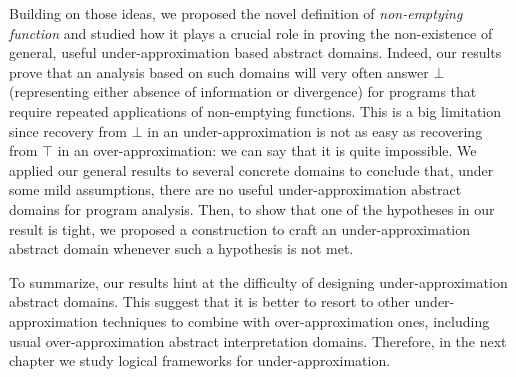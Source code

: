 Building on those ideas, we proposed the novel definition of \emph{non-emptying function} and studied how it plays a crucial role in proving the non-existence of general, useful under-approximation based abstract domains. Indeed, our results prove that an analysis based on such domains will very often answer $\bot$ (representing either absence of information or divergence) for programs that require repeated applications of non-emptying functions. This is a big limitation since recovery from $\bot$ in an under-approximation is not as easy as recovering from $\top$ in an over-approximation: we can say that it is quite impossible.
We applied our general results to several concrete domains to conclude that, under some mild assumptions, there are no useful under-approximation abstract domains for program analysis. Then, to show that one of the hypotheses in our result is tight, we proposed a construction to craft an under-approximation abstract domain whenever such a hypothesis is not met.

To summarize, our results hint at the difficulty of designing under-approximation abstract domains. This suggest that it is better to resort to other under-approximation techniques to combine with over-approximation ones, including usual over-approximation abstract interpretation domains. Therefore, in the next chapter we study logical frameworks for under-approximation.
